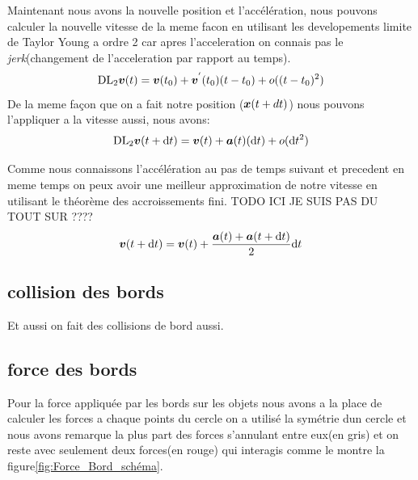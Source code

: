 \documentclass[a4paper, 11pt, oneside]{article} %
\newcommand{\dd}[1]{\mathrm{d}#1}
\begin{document}
        Maintenant nous avons la nouvelle position et l'accélération, nous pouvons calculer la nouvelle vitesse de la meme facon en utilisant les developements limite de Taylor Young a ordre 2 car apres l'acceleration on connais pas le \textit{jerk}(changement de l'acceleration par rapport au temps).
        \begin{equation}
            \mathrm{DL}_2\vb*{v}(t) = \vb*{v}(t_0) + \vb*{v}^{'}(t_0)(t-t_0) + o((t-t_0)^2)
        \end{equation}
        De la meme façon que on a fait notre position ($\vb*{x}(t+dt)$) nous pouvons l'appliquer a la vitesse aussi, nous avons:
        \begin{equation}
            \mathrm{DL}_2\vb*{v}(t+\dd t) = \vb*{v}(t) + \vb*{a}(t)(\dd t) + o(\dd t^2)
        \end{equation}

        Comme nous connaissons l'accélération au pas de temps suivant et precedent en meme temps on peux avoir une meilleur approximation de notre vitesse en utilisant le théorème des accroissements fini. TODO ICI JE SUIS PAS DU TOUT SUR ????
        \begin{equation}
            \label{eq:verletVitesse}
            \vb*{v}(t+\dd t) = \vb*{v}(t)+\frac{\vb*{a}(t)+\vb*{a}(t+\dd t)}{2}\dd t 
        \end{equation}

    \subsection{collision des bords}
        Et aussi on fait des collisions de bord aussi.
        
    \subsection{force des bords}
        Pour la force appliquée par les bords sur les objets nous avons a la place de calculer les forces a chaque points du cercle on a utilisé la symétrie dun cercle et nous avons remarque la plus part des forces s'annulant entre eux(en gris) et on reste avec seulement deux forces(en rouge) qui interagis comme le montre la figure\ref{fig:Force_Bord_schéma}.
\end{document}
